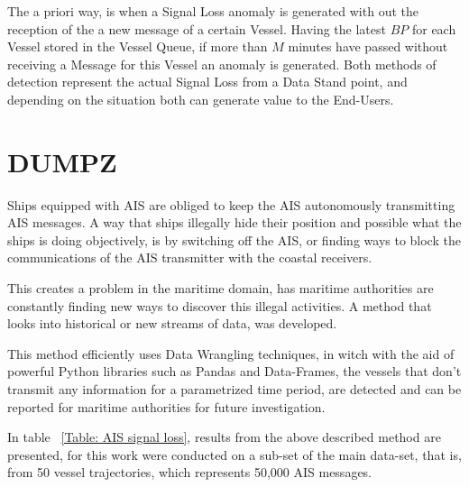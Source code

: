 The a priori way, is when a Signal Loss anomaly is generated with out the reception of the a new message of a certain Vessel. Having the latest $BP$ for each Vessel stored in the Vessel Queue, if more than $M$ minutes have passed without receiving a Message for this Vessel an anomaly is generated. Both methods of detection represent the actual Signal Loss from a Data Stand point, and depending on the situation both can generate value to the End-Users. 


\section{DUMPZ}

Ships equipped with AIS are obliged to keep the AIS autonomously transmitting AIS messages. A way that ships illegally hide their position and possible what the ships is doing objectively, is by switching off the AIS, or finding ways to block the communications of the AIS transmitter with the coastal receivers.

This creates a problem in the maritime domain, has maritime authorities are constantly finding new ways to discover this illegal activities. A method that looks into historical or new streams of data, was developed. 

This method efficiently uses Data Wrangling techniques, in witch with the aid of powerful Python libraries such as Pandas and Data-Frames, the vessels that don't transmit any information for a parametrized time period, are detected and can be reported for maritime authorities for future investigation.

In table ~\ref{Table: AIS signal loss}, results from the above described method are presented, for this work were conducted on a sub-set of the main data-set, that is, from 50 vessel trajectories, which represents 50,000 AIS messages.

